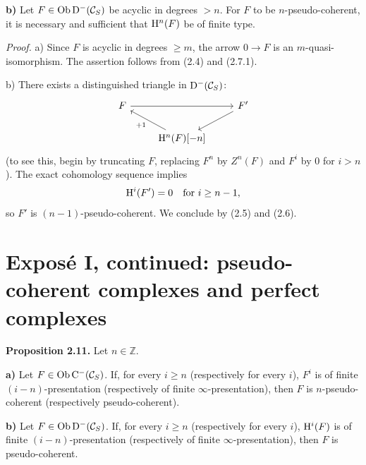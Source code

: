 \documentclass[11pt]{article}
\newcommand{\Spec}{\operatorname{Spec}}
\begin{document}
\textbf{b)} Let \(F\in\operatorname{Ob}\mathrm D^-(\mathcal C_S)\) be acyclic in degrees \(>n\). For \(F\) to be \(n\)-pseudo-coherent, it is necessary and sufficient that \(\mathrm H^n(F)\) be of finite type.

\emph{Proof.} a) Since \(F\) is acyclic in degrees \(\geq m\), the arrow \(0\to F\) is an \(m\)-quasi-isomorphism. The assertion follows from (2.4) and (2.7.1).

b) There exists a distinguished triangle in \(\mathrm D^-(\mathcal C_S)\):
\[
\begin{tikzcd}
F \arrow[rr] && F' \arrow[dl]\\
& \Ho^n(F)[-n] \arrow[ul,"+1"] &
\end{tikzcd}
\]
(to see this, begin by truncating \(F\), replacing \(F^n\) by \(Z^n(F)\) and \(F^i\) by \(0\) for \(i>n\)). The exact cohomology sequence implies
\[
  \mathrm H^i(F')=0\quad\text{for }i\geq n-1,
\]
so \(F'\) is \((n-1)\)-pseudo-coherent. We conclude by (2.5) and (2.6).



\providecommand{\RHom}{\mathrm R\!\Hom}
\providecommand{\Ext}{\operatorname{Ext}}
\providecommand{\coh}{\operatorname{coh}}
\providecommand{\PreCoh}{\operatorname{precoh}}
\providecommand{\Tr}{\operatorname{Tr}}
\providecommand{\Qis}{\operatorname{Qis}}
\providecommand{\Rad}{\operatorname{rad}}
\providecommand{\Spec}{\operatorname{Spec}}
\providecommand{\End}{\operatorname{End}}
\providecommand{\Id}{\operatorname{Id}}
\providecommand{\limdir}{\mathop{\mathrm{lim}}\limits_{\longrightarrow}}
\providecommand{\liminv}{\mathop{\mathrm{lim}}\limits_{\longleftarrow}}
\providecommand{\qcoh}{\operatorname{qcoh}}
\providecommand{\amp}{\operatorname{amp}}


\section*{Exposé I, continued: pseudo-coherent complexes and perfect complexes}

\textbf{Proposition 2.11.} Let \(n\in\mathbb Z\).

\textbf{a)} Let \(F\in\operatorname{Ob}\mathrm C^-(\mathcal C_S)\). If, for every \(i\geq n\) (respectively for every \(i\)), \(F^i\) is of finite \((i-n)\)-presentation (respectively of finite \(\infty\)-presentation), then \(F\) is \(n\)-pseudo-coherent (respectively pseudo-coherent).

\textbf{b)} Let \(F\in\operatorname{Ob}\mathrm D^-(\mathcal C_S)\). If, for every \(i\geq n\) (respectively for every \(i\)), \(\mathrm H^i(F)\) is of finite \((i-n)\)-presentation (respectively of finite \(\infty\)-presentation), then \(F\) is pseudo-coherent.
\end{document}

